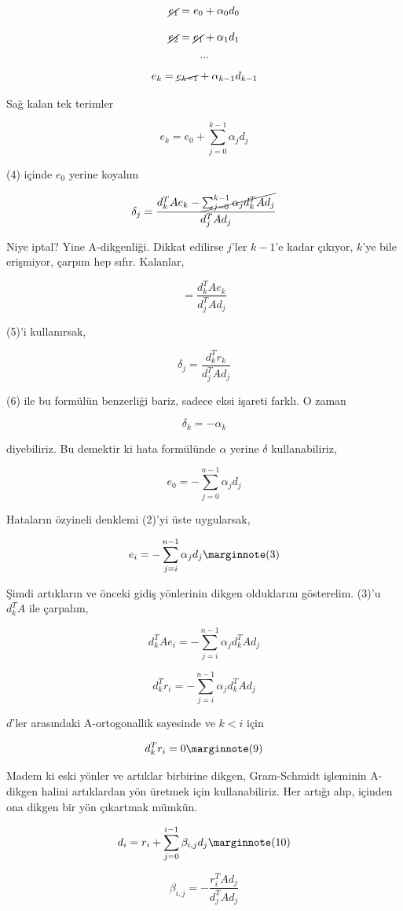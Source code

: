\documentclass[12pt,fleqn]{article}\usepackage{../../common}
\begin{document}
$$ \cancel{e_{1}} = e_0 + \alpha_0 d_0$$

$$ \cancel{e_{2}} = \cancel{e_1} + \alpha_1 d_1$$

$$ ... $$

$$ e_{k} = \cancel{e_{k-1}} + \alpha_{k-1} d_{k-1}$$

Sağ kalan tek terimler 

$$ e_k = e_0 + \sum _{ j=0}^{k-1} \alpha_j d_j $$

(4) içinde $e_0$ yerine koyalım

$$ \delta_j = \frac{ d_k^T A e_k - \cancel{\sum _{ j=0}^{k-1} \alpha_j d_k^T A d_j}}
{ d_j^T A d_j } 
$$

Niye iptal? Yine A-dikgenliği. Dikkat edilirse $j$'ler $k-1$'e kadar
çıkıyor, $k$'ye bile erişmiyor, çarpım hep sıfır. Kalanlar,

$$  = \frac{ d_k^T A e_k}
{ d_j^T A d_j } 
$$

(5)'i kullanırsak, 

$$ \delta_j = \frac{ d_k^T r_k}
{ d_j^T A d_j } 
$$


(6) ile bu formülün benzerliği bariz, sadece eksi işareti farklı. O zaman 

$$ \delta_k = -\alpha_k $$

diyebiliriz. Bu demektir ki hata formülünde $\alpha$ yerine $\delta$
kullanabiliriz, 

$$ e_0 = -\sum _{ j=0}^{n-1} \alpha_j d_j $$

Hataların özyineli denklemi (2)'yi üste uygularsak, 

$$ e_i = -\sum _{ j=i}^{n-1} \alpha_j d_j 
\mlabel{3}
$$

Şimdi artıkların ve önceki gidiş yönlerinin dikgen olduklarını
gösterelim. (3)'u $d_k^TA$ ile çarpalım, 

$$ d_k^TAe_i = -\sum _{ j=i}^{n-1} \alpha_j  d_k^TAd_j 
$$

$$ d_k^Tr_i = -\sum _{ j=i}^{n-1} \alpha_j  d_k^TAd_j 
$$

$d$'ler arasındaki A-ortogonallik sayesinde ve $k < i$ için 

$$ d_k^Tr_i = 0
\mlabel{9}
$$

Madem ki eski yönler ve artıklar birbirine dikgen, Gram-Schmidt
işleminin A-dikgen halini artıklardan yön üretmek için
kullanabiliriz. Her artığı alıp, içinden ona dikgen bir yön çıkartmak
mümkün.

$$ d_i = r_i + \sum _{ j=0}^{i-1} \beta_{i,j}d_j 
\mlabel{10}
$$

$$ \beta_{i,j} = - \frac{ r_i^TAd_j}{d_j^TAd_j} $$
\end{document}

